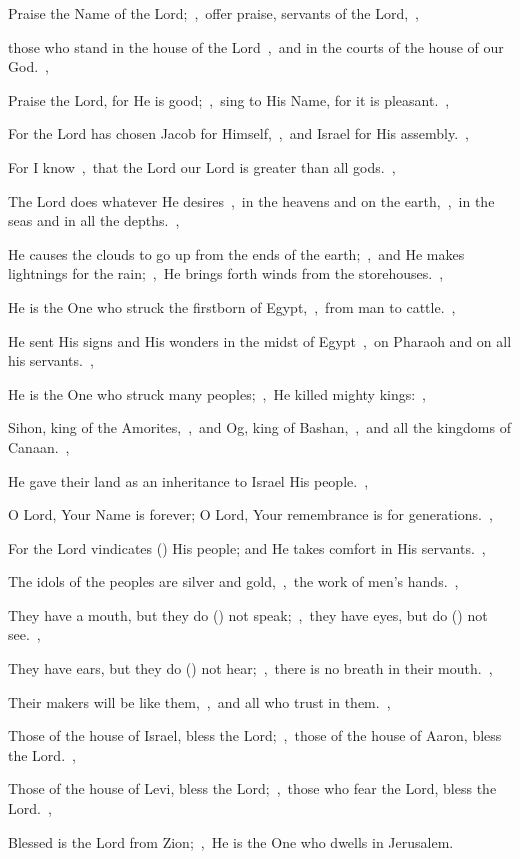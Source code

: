 \documentclass[12pt,twoside,a5paper]{article}
\begin{document}
\begin{normalparskip}
  Praise the Name of the Lord;~\sep\ offer praise, servants of the Lord,~\sep


  those who stand in the house of the Lord~\sep\ and in the courts of the house of our God.~\sep

  Praise the Lord, for He is good;~\sep\ sing to His Name, for it is pleasant.~\sep

  For the Lord has chosen Jacob for Himself,~\sep\ and Israel for His assembly.~\sep

  For I know~\sep\ that the Lord our Lord is greater than all gods.~\sep

  The Lord does whatever He desires~\sep\ in the heavens and on the earth,~\sep\ in the seas and in all the depths.~\sep

  He causes the clouds to go up from the ends of the earth;~\sep\ and He makes lightnings for the rain;~\sep\ He brings forth winds from the storehouses.~\sep

  He is the One who struck the firstborn of Egypt,~\sep\ from man to cattle.~\sep

  He sent His signs and His wonders in the midst of Egypt~\sep\ on Pharaoh and on all his servants.~\sep

  He is the One who struck many peoples;~\sep\ He killed mighty kings:~\sep

  Sihon, king of the Amorites,~\sep\ and Og, king of Bashan,~\sep\ and all the kingdoms of Canaan.~\sep

  He gave their land as an inheritance to Israel His people.~\sep

  O Lord, Your Name is forever; O Lord, Your remembrance is for generations.~\sep

  For the Lord vindicates () His people; and He takes comfort in His servants.~\sep

  The idols of the peoples are silver and gold,~\sep\ the work of men's hands.~\sep

  They have a mouth, but they do () not speak;~\sep\ they have eyes, but do () not see.~\sep

  They have ears, but they do () not hear;~\sep\ there is no breath in their mouth.~\sep

  Their makers will be like them,~\sep\ and all who trust in them.~\sep

  Those of the house of Israel, bless the Lord;~\sep\ those of the house of Aaron, bless the Lord.~\sep

  Those of the house of Levi, bless the Lord;~\sep\ those who fear the Lord, bless the Lord.~\sep

  Blessed is the Lord from Zion;~\sep\ He is the One who dwells in Jerusalem.
\end{normalparskip}
\end{document}
